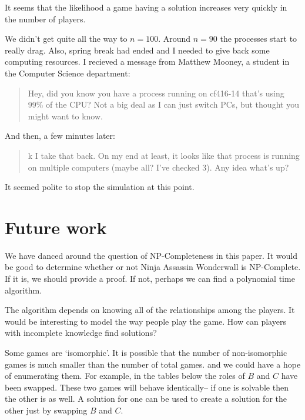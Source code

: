 \documentclass[12pt,x11names, rgb]{article}
\begin{document}
    It seems that the likelihood a game having a solution increases very quickly in the number of players.

    We didn't get quite all the way to $n=100$. Around $n=90$ the processes start to really drag. Also, spring break had ended and I needed to give back some computing resources. I recieved a message from Matthew Mooney, a student in the Computer Science department:
    \begin{quote}
    Hey, did you know you have a process running on cf416-14 that's using 99\% of the CPU? Not a big deal as I can just switch PCs, but thought you might want to know.
    \end{quote}
    And then, a few minutes later:
    \begin{quote}
    k I take that back. On my end at least, it looks like that process is running on multiple computers (maybe all? I've checked 3). Any idea what's up?
    \end{quote}

    It seemed polite to stop the simulation at this point.

\section{Future work}
    We have danced around the question of NP-Completeness in this paper. It would be good to determine whether or not Ninja Assassin Wonderwall is NP-Complete. If it is, we should provide a proof. If not, perhaps we can find a polynomial time algorithm.

    The algorithm depends on knowing all of the relationships among the players. It would be interesting to model the way people play the game. How can players with incomplete knowledge find solutions?

    Some games are `isomorphic'. It is possible that the number of non-isomorphic games is much smaller than the number of total games. and we could have a hope of enumerating them. For example, in the tables below the roles of $B$ and $C$ have been swapped. These two games will behave identically-- if one is solvable then the other is as well. A solution for one can be used to create a solution for the other just by swapping $B$ and $C$.
\end{document}
